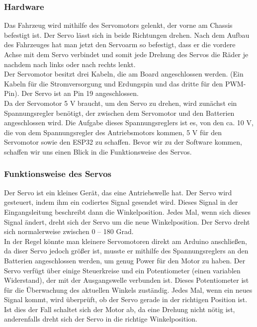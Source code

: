 	\subsubsection{Hardware}
    	Das Fahrzeug wird mithilfe des Servomotors gelenkt, der vorne am Chassis befestigt ist. Der Servo lässt sich in beide Richtungen drehen. Nach dem Aufbau des Fahrzeuges hat man jetzt den Servoarm so befestigt, dass er die vordere Achse mit dem Servo verbindet und somit jede Drehung des Servos die Räder je nachdem nach links oder nach rechts lenkt. \\
    	
        Der Servomotor besitzt drei Kabeln, die am Board angeschlossen werden. (Ein Kabeln für die Stromversorgung und Erdungspin und das dritte für den PWM-Pin). Der Servo ist an Pin 19 angeschlossen.\\
        
        Da der Servomotor 5 V braucht, um den Servo zu drehen, wird zunächst ein Spannungsregler benötigt, der zwischen dem Servomotor und den Batterien angeschlossen wird.
        Die Aufgabe dieses Spannungsreglers ist es, von den ca. 10 V, die von dem Spannungsregler des Antriebsmotors kommen, 5 V für den Servomotor sowie den ESP32 zu schaffen.
        Bevor wir zu der Software kommen, schaffen wir uns einen Blick in die Funktionsweise des Servos.\\
        
    \subsubsection{Funktionsweise des Servos}
    \label{FuktionsweiseServo}
    
        Der Servo ist ein kleines Gerät, das eine Antriebswelle hat. Der Servo wird gesteuert, indem ihm ein codiertes Signal gesendet wird. Dieses Signal in der Eingangsleitung beschreibt dann die Winkelposition. Jedes Mal, wenn sich dieses Signal ändert, dreht sich der Servo um die neue Winkelposition. Der Servo dreht sich normalerweise zwischen 0 – 180 Grad.\\
        
        In der Regel könnte man kleinere Servomotoren direkt am Arduino anschließen, da diser Servo jedoch größer ist, musste er mithilfe des Spannungsreglers an den Batterien angeschlossen werden, um genug Power für den Motor zu haben. Der Servo verfügt über einige Steuerkreise und ein Potentiometer (einen variablen Widerstand), der mit der Ausgangswelle verbunden ist. Dieses Potentiometer ist für die Überwachung des aktuellen Winkels zuständig. Jedes Mal, wenn ein neues Signal kommt, wird überprüft, ob der Servo gerade in der richtigen Position ist. Ist dies der Fall schaltet sich der Motor ab, da eine Drehung nicht nötig ist, anderenfalls dreht sich der Servo in die richtige Winkelposition.\\
        
